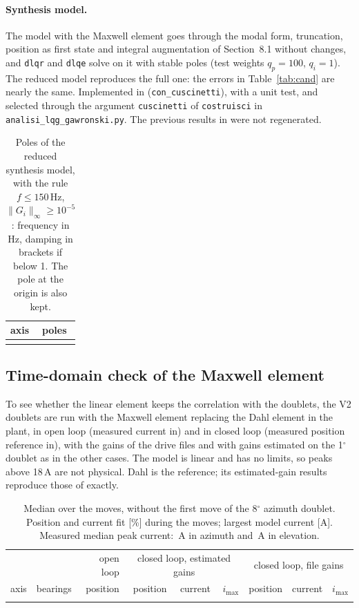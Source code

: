 \documentclass[10pt,a4paper]{article}
\numberwithin{equation}{section}
\begin{document}
\paragraph{Synthesis model.} The model with the Maxwell element goes through the modal form, truncation, position as first state and integral augmentation of Section~8.1 without changes, and \texttt{dlqr} and \texttt{dlqe} solve on it with stable poles (test weights $q_p=100$, $q_i=1$). The reduced model reproduces the full one: the errors in Table~\ref{tab:cand} are nearly the same. Implemented in  (\texttt{con\_cuscinetti}), with a unit test, and selected through the argument \texttt{cuscinetti} of \texttt{costruisci} in \texttt{analisi\_lqg\_gawronski.py}. The previous results in  were not regenerated.

\begin{table}[H]\centering\footnotesize
\caption{Poles of the reduced synthesis model, with the rule $f\leq150$\,Hz, $\|G_i\|_\infty\geq10^{-5}$: frequency in Hz, damping in brackets if below 1. The pole at the origin is also kept.}\label{tab:poles}
\begin{tabular}{lL{13cm}}\toprule
axis & poles \\ \midrule
\\ \bottomrule
\end{tabular}\end{table}

\subsection{Time-domain check of the Maxwell element}\label{sec:td}
To see whether the linear element keeps the correlation with the doublets, the V2 doublets are run with the Maxwell element replacing the Dahl element in the plant, in open loop (measured current in) and in closed loop (measured position reference in), with the gains of the drive files and with gains estimated on the 1$^\circ$ doublet as in the other cases. The model is linear and has no limits, so peaks above 18\,A are not physical. Dahl is the reference; its estimated-gain results reproduce those of  exactly.

\begin{table}[H]\centering\footnotesize\setlength{\tabcolsep}{4pt}
\caption{Median over the moves, without the first move of the 8$^\circ$ azimuth doublet. Position and current fit [\%] during the moves; largest model current [A]. Measured median peak current: \measA\,A in azimuth and \measP\,A in elevation.}\label{tab:td}
\begin{tabular}{llrrrrrrr}\toprule
& & open loop & \multicolumn{3}{c}{closed loop, estimated gains} & \multicolumn{3}{c}{closed loop, file gains} \\
\cmidrule(lr){4-6}\cmidrule(lr){7-9}
axis & bearings & position & position & current & $i_\mathrm{max}$ & position & current & $i_\mathrm{max}$ \\ \midrule
\\ \bottomrule
\end{tabular}\end{table}
\end{document}
